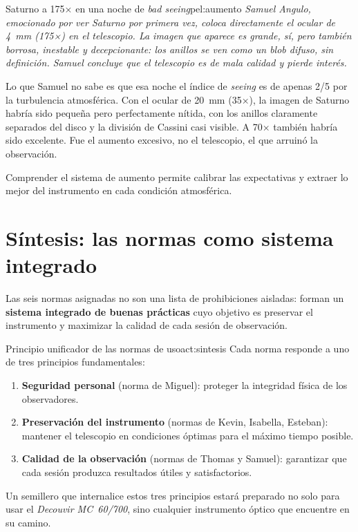 \documentclass[12pt,oneside]{book}
\begin{document}
\begin{peligro}{Saturno a 175× en una noche de \emph{bad seeing}}{pel:aumento}
    \itshape
    Samuel Angulo, emocionado por ver Saturno por primera vez, coloca directamente
    el ocular de 4~mm (175×) en el telescopio. La imagen que aparece es grande,
    sí, pero también borrosa, inestable y decepcionante: los anillos se ven como
    un blob difuso, sin definición. Samuel concluye que el telescopio es de mala
    calidad y pierde interés.

    Lo que Samuel no sabe es que esa noche el índice de \emph{seeing} es de apenas
    2/5 por la turbulencia atmosférica. Con el ocular de 20~mm (35×), la imagen de
    Saturno habría sido pequeña pero perfectamente nítida, con los anillos claramente
    separados del disco y la división de Cassini casi visible. A 70× también habría
    sido excelente. Fue el aumento excesivo, no el telescopio, el que arruinó la
    observación.

    \medskip
    \normalfont
    Comprender el sistema de aumento permite calibrar las expectativas y extraer
    lo mejor del instrumento en cada condición atmosférica. \cite{suiter1994,tonkin2007}
\end{peligro}

\section{Síntesis: las normas como sistema integrado}

Las seis normas asignadas no son una lista de prohibiciones aisladas: forman un
\textbf{sistema integrado de buenas prácticas} cuyo objetivo es preservar el
instrumento y maximizar la calidad de cada sesión de observación.

\begin{actividad}{Principio unificador de las normas de uso}{act:sintesis}
    Cada norma responde a uno de tres principios fundamentales:
    \begin{enumerate}[leftmargin=1.5em]
        \item \textbf{Seguridad personal} (norma de Miguel): proteger la integridad
              física de los observadores.
        \item \textbf{Preservación del instrumento} (normas de Kevin, Isabella, Esteban):
              mantener el telescopio en condiciones óptimas para el máximo tiempo posible.
        \item \textbf{Calidad de la observación} (normas de Thomas y Samuel): garantizar
              que cada sesión produzca resultados útiles y satisfactorios.
    \end{enumerate}
    Un semillero que internalice estos tres principios estará preparado no solo
    para usar el \textit{Decouvir MC~60/700}, sino cualquier instrumento óptico
    que encuentre en su camino.
\end{actividad}
\end{document}
